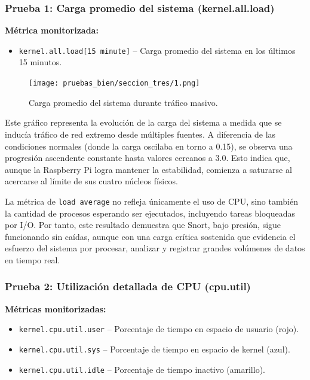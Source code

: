 \documentclass[11pt,a4paper,twoside]{report}
\begin{document}
\subsubsection*{Prueba 1: Carga promedio del sistema (kernel.all.load)}

\textbf{Métrica monitorizada:}
\begin{itemize}
	\item \texttt{kernel.all.load[15 minute]} – Carga promedio del sistema en los últimos 15 minutos.
\end{itemize}

\begin{figure}[H]
	\centering
	\texttt{[image: pruebas\_bien/seccion\_tres/1.png]}
	\caption{Carga promedio del sistema durante tráfico masivo.}
\end{figure}

Este gráfico representa la evolución de la carga del sistema a medida que se inducía tráfico de red extremo desde múltiples fuentes. A diferencia de las condiciones normales (donde la carga oscilaba en torno a 0.15), se observa una progresión ascendente constante hasta valores cercanos a 3.0. Esto indica que, aunque la Raspberry Pi logra mantener la estabilidad, comienza a saturarse al acercarse al límite de sus cuatro núcleos físicos.\newline

La métrica de \texttt{load average} no refleja únicamente el uso de CPU, sino también la cantidad de procesos esperando ser ejecutados, incluyendo tareas bloqueadas por I/O. Por tanto, este resultado demuestra que Snort, bajo presión, sigue funcionando sin caídas, aunque con una carga crítica sostenida que evidencia el esfuerzo del sistema por procesar, analizar y registrar grandes volúmenes de datos en tiempo real.

\subsubsection*{Prueba 2: Utilización detallada de CPU (cpu.util)}

\textbf{Métricas monitorizadas:}
\begin{itemize}
	\item \texttt{kernel.cpu.util.user} – Porcentaje de tiempo en espacio de usuario (rojo).
	\item \texttt{kernel.cpu.util.sys} – Porcentaje de tiempo en espacio de kernel (azul).
	\item \texttt{kernel.cpu.util.idle} – Porcentaje de tiempo inactivo (amarillo).
\end{itemize}
\end{document}
